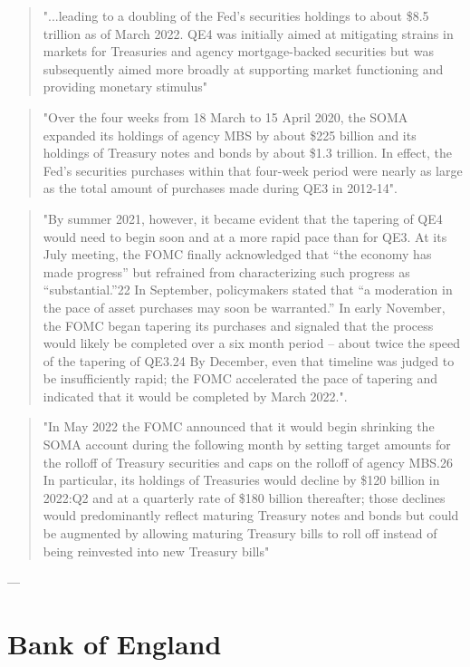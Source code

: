 \begin{quote}
"...leading to a doubling of the Fed’s securities holdings to about \$8.5 trillion as of March 2022. QE4 was initially aimed at mitigating strains in markets for Treasuries and agency mortgage-backed securities but was subsequently aimed more broadly at supporting market functioning and providing monetary stimulus"
\end{quote}
\begin{quote}
"Over the four weeks from 18 March to 15 April 2020, the SOMA expanded its holdings of agency MBS by about \$225 billion and its holdings of Treasury notes and bonds by about \$1.3 trillion. In effect, the Fed’s securities purchases within that four-week period were nearly as large as the total amount of purchases made during QE3 in 2012-14".
\end{quote}
\begin{quote}
"By summer 2021, however, it became evident that the tapering of QE4 would need to begin soon and at a more rapid pace than for QE3. At its July meeting, the FOMC finally acknowledged that “the economy has made progress” but refrained from characterizing such progress as “substantial.”22 In September, policymakers stated that “a moderation in the pace of asset purchases may soon be warranted.” In early November, the FOMC began tapering its purchases and signaled that the process would likely be completed over a six month period – about twice the speed of the tapering of QE3.24 By December, even that timeline was judged to be insufficiently rapid; the FOMC accelerated the pace of tapering and indicated that it would be completed by March 2022.".
\end{quote}
\begin{quote}
"In May 2022 the FOMC announced that it would begin shrinking the SOMA account during the following month by setting target amounts for the rolloff of Treasury securities and caps on the rolloff of agency MBS.26 In particular, its holdings of Treasuries would decline by \$120 billion in 2022:Q2 and at a quarterly rate of \$180 billion thereafter; those declines would predominantly reflect maturing Treasury notes and bonds but could be augmented by allowing maturing Treasury bills to roll off instead of being reinvested into new Treasury bills"
\end{quote}
---
\section{Bank of England}

